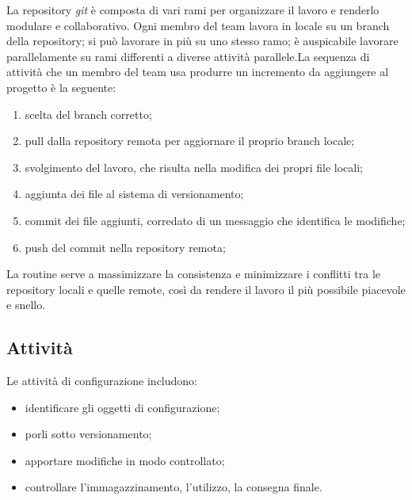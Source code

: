 	La repository \textit{git} è composta di vari rami per organizzare il lavoro e renderlo modulare e collaborativo. Ogni membro del team lavora in locale su un branch della repository; si può lavorare in più su uno stesso ramo; è auspicabile lavorare parallelamente su rami differenti a diverse attività parallele.\newline La sequenza di attività che un membro del team usa produrre un incremento da aggiungere al progetto è la seguente:
	\begin{enumerate}
		\item scelta del branch corretto;
		\item pull dalla repository remota per aggiornare il proprio branch locale;
		\item svolgimento del lavoro, che risulta nella modifica dei propri file locali;
		\item aggiunta dei file al sistema di versionamento;
		\item commit dei file aggiunti, corredato di un messaggio che identifica le modifiche;
		\item push del commit nella repository remota;
	\end{enumerate}
	La routine serve a massimizzare la consistenza e minimizzare i conflitti tra le repository locali e quelle remote, così da rendere il lavoro il più possibile piacevole e snello.
	
	\subsection{Attività}
	Le attività di configurazione includono:
	\begin{itemize}
		\item identificare gli oggetti di configurazione;
		\item porli sotto versionamento;
		\item apportare modifiche in modo controllato;
		\item controllare l'immagazzinamento, l'utilizzo, la consegna finale.
	\end{itemize}
	
	

	
